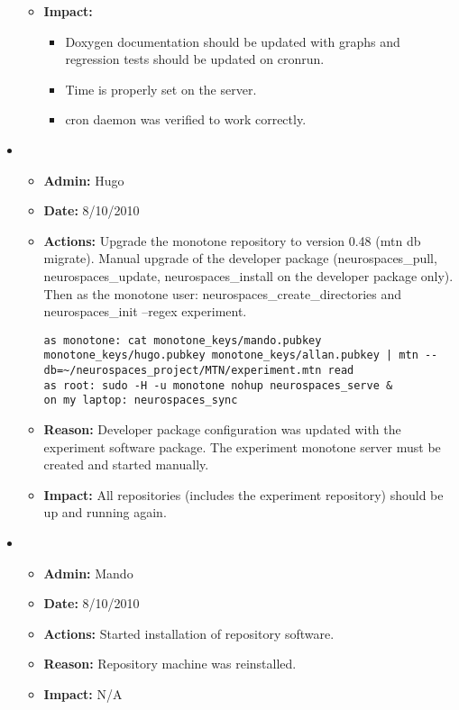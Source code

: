 \documentclass[12pt]{article}
\begin{document}
\begin{itemize}
\begin{itemize}
\item[] {\bf Impact:} 
\begin{itemize}
\item[] Doxygen documentation should be updated with graphs and regression tests should be updated on cronrun. 
\item[] Time is properly set on the server.
\item[] cron daemon was verified to work correctly.
\end{itemize}
\end{itemize}

\item 
\begin{itemize}
\item[] {\bf Admin:} Hugo
\item[] {\bf Date:} 8/10/2010 
\item[] {\bf Actions:} Upgrade the monotone repository to version 0.48
  (mtn db migrate). Manual upgrade of the developer package
  (neurospaces\_pull, neurospaces\_update, neurospaces\_install on the
  developer package only).  Then as the monotone user:
  neurospaces\_create\_directories and neurospaces\_init --regex
  experiment.
\begin{verbatim}
as monotone: cat monotone_keys/mando.pubkey monotone_keys/hugo.pubkey monotone_keys/allan.pubkey | mtn --db=~/neurospaces_project/MTN/experiment.mtn read
as root: sudo -H -u monotone nohup neurospaces_serve &
on my laptop: neurospaces_sync
\end{verbatim}
\item[] {\bf Reason:} Developer package configuration was updated with
  the experiment software package.  The experiment monotone server
  must be created and started manually.
\item[] {\bf Impact:} All repositories (includes the experiment
  repository) should be up and running again.
\end{itemize}

\item 
\begin{itemize}
\item[] {\bf Admin:} Mando
\item[] {\bf Date:} 8/10/2010 
\item[] {\bf Actions:} Started installation of repository software.
\item[] {\bf Reason:} Repository machine was reinstalled.
\item[] {\bf Impact:} N/A
\end{itemize}



\end{itemize}
\end{document}
